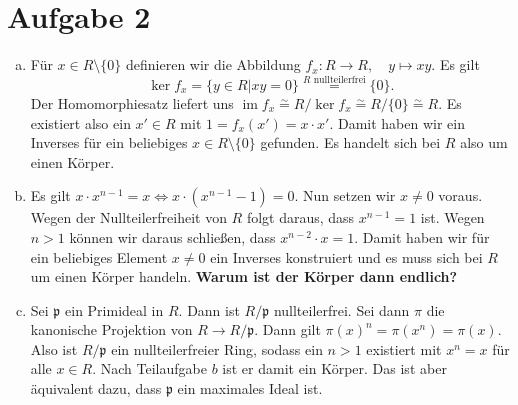 \documentclass{article}
\begin{document}
    \section*{Aufgabe 2}
    \begin{enumerate}[(a)]
        \item Für $x\in R\setminus \{0\}$ definieren wir die Abbildung $f_x\colon R\to R,\quad y \mapsto xy$. Es gilt $$\ker f_x = \{y\in R | xy = 0\} \overset{R \text{ nullteilerfrei}}{=} \{0\}.$$ Der Homomorphiesatz liefert uns $\operatorname{im} f_x \overset{\sim}{=}  R/\ker f_x \overset{\sim}{=} R/\{0\} \overset{\sim}{=} R$. Es existiert also ein $x' \in R$ mit $1= f_x(x') = x\cdot x'$. Damit haben wir ein Inverses für ein beliebiges $x\in R\setminus\{0\}$ gefunden. Es handelt sich bei $R$ also um einen Körper.
        \item Es gilt $x \cdot x^{n-1} = x \Leftrightarrow x\cdot (x^{n-1} - 1) = 0$. Nun setzen wir $x \neq 0$ voraus. Wegen der Nullteilerfreiheit von $R$ folgt daraus, dass $x^{n-1} = 1$ ist. Wegen $n > 1$ können wir daraus schließen, dass $x^{n-2} \cdot x = 1$. Damit haben wir für ein beliebiges Element $x\neq 0$ ein Inverses konstruiert und es muss sich bei $R$ um einen Körper handeln. \textbf{Warum ist der Körper dann endlich?}
        \item Sei $\mathfrak{p}$ ein Primideal in $R$. Dann ist $R/\mathfrak{p}$ nullteilerfrei. Sei dann $\pi$ die kanonische Projektion von $R \to R/\mathfrak{p}$. Dann gilt $\pi(x)^n = \pi(x^n) = \pi(x)$. Also ist $R/\mathfrak{p}$ ein nullteilerfreier Ring, sodass ein $n> 1$ existiert mit $x^n = x$ für alle $x\in R$. Nach Teilaufgabe $b$ ist er damit ein Körper. Das ist aber äquivalent dazu, dass $\mathfrak{p}$ ein maximales Ideal ist.
    \end{enumerate}
\end{document}
